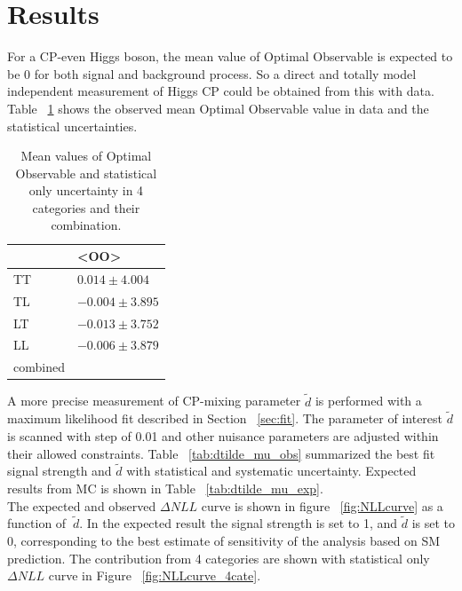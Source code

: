 \section{Results}
\label{sec:result}

For a CP-even Higgs boson, the mean value of Optimal Observable is expected to be 0 for both signal and background process. So a direct and totally model independent measurement of Higgs CP could be obtained from this with data. Table ~\ref{tab:meanOO} shows the observed mean Optimal Observable value in data and the statistical uncertainties. 

\begin{table}[]
\centering
\begin{tabular}{ll}
\hline
         & \textless{}OO\textgreater{} \\ \hline \hline
TT       &   $  0.014 \pm 4.004 $      \\ \hline
TL       &   $ -0.004 \pm 3.895 $      \\ \hline
LT       &   $ -0.013 \pm 3.752 $      \\ \hline
LL       &   $ -0.006 \pm 3.879 $      \\ \hline \hline
combined &                             \\ \hline
\end{tabular}
\caption{Mean values of Optimal Observable and statistical only uncertainty in 4 categories and their combination. }
\label{tab:meanOO}
\end{table}


A more precise measurement of CP-mixing parameter $\tilde{d}$ is performed with a maximum likelihood fit described in Section ~\ref{sec:fit}. The parameter of interest $\tilde{d}$ is scanned with step of 0.01 and other nuisance parameters are adjusted within their allowed constraints. Table ~\ref{tab:dtilde_mu_obs} summarized the best fit signal strength and $\tilde{d}$ with statistical and systematic uncertainty. Expected results from MC is shown in Table ~\ref{tab:dtilde_mu_exp}. \\

The expected and observed $\Delta NLL$ curve is shown in figure ~\ref{fig:NLLcurve} as a function of $~\tilde{d}$. In the expected result the signal strength is set to 1, and $\tilde{d}$ is set to 0, corresponding to the best estimate of sensitivity of the analysis based on SM prediction. The contribution from 4 categories are shown with statistical only $\Delta NLL$ curve in Figure ~\ref{fig:NLLcurve_4cate}. 

